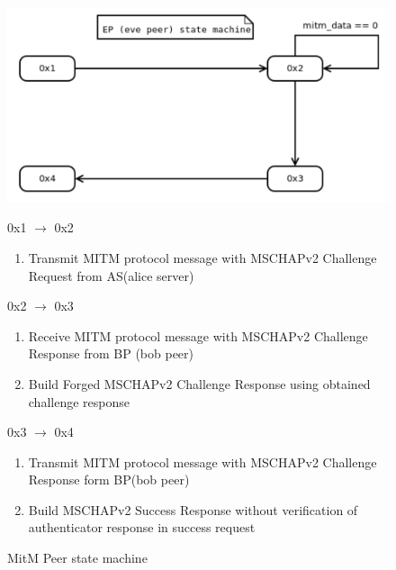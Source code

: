 \documentclass{amsart}
\begin{document}
\begin{figure}
  \centering
  \includegraphics[scale=0.5]{res/eve-peer-mitm-state-machine-diagram.png}

  0x1 $\rightarrow$ 0x2
  \begin{enumerate}
    \item Transmit MITM protocol message with MSCHAPv2 Challenge
      Request from AS(alice server)
  \end{enumerate}

  0x2 $\rightarrow$ 0x3
  \begin{enumerate}
    \item Receive MITM protocol message with MSCHAPv2 Challenge
      Response from BP (bob peer)
    \item Build Forged MSCHAPv2 Challenge
      Response using obtained challenge response
  \end{enumerate}

  0x3 $\rightarrow$ 0x4
  \begin{enumerate}
    \item Transmit MITM protocol message with MSCHAPv2 Challenge
      Response form BP(bob peer)
    \item Build MSCHAPv2 Success
      Response without verification of authenticator response in success request
  \end{enumerate}
  \caption{MitM Peer state machine}
\end{figure}
\end{document}
